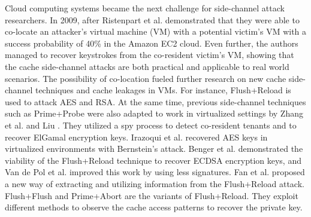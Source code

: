 Cloud computing systems became the next challenge for side-channel attack researchers.
In 2009, after Ristenpart et al. \cite{get-off-my-cloud} demonstrated that they were able to co-locate an attacker’s virtual machine (VM) with a potential victim’s VM with a success probability of 40\% in the Amazon EC2 cloud.
 Even further, the authors managed to recover keystrokes from the co-resident victim’s VM, showing that the cache side-channel attacks are both practical and applicable to real world scenarios.
The possibility of co-location fueled further research on new cache side-channel techniques and cache leakages in VMs.
For instance, Flush+Reload is used to attack AES \cite{Irazoqui2014} and RSA\cite{flushreload}.
At the same time, previous side-channel techniques such as Prime+Probe were also
adapted to work in virtualized settings by Zhang et al. \cite{YinqianZhang2012-cross-vm} and Liu \cite{liu2015last}.
They utilized a spy process to detect co-resident tenants and to recover ElGamal encryption keys.
Irazoqui et al. \cite{fine2014} recovered AES keys in virtualized environments with Bernstein’s attack.
Benger et al. \cite{Benger2014} demonstrated the viability of the Flush+Reload technique to recover ECDSA encryption keys,
and Van de Pol et al. \cite{Van2015} improved this work by using less signatures.
Fan et al. \cite{Fan2016} proposed a new way of extracting and utilizing information from the Flush+Reload attack.
Flush+Flush \cite{gruss2016flush} and Prime+Abort \cite{disselkoen2017prime+abort} are the variants of Flush+Reload.
They exploit different methods to observe the cache access patterns to recover the private key.





